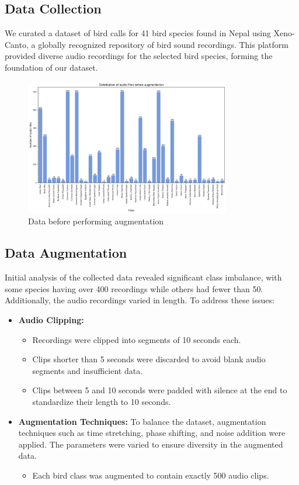 \subsection{Data Collection}
We curated a dataset of bird calls for 41 bird species found in Nepal using Xeno-Canto, a globally recognized repository of bird sound recordings. This platform provided diverse audio recordings for the selected bird species, forming the foundation of our dataset.
\begin{figure}[h!]
    \centering
    \includegraphics[width=0.8\textwidth]{images/before_augmentation.png}
    \caption{Data before performing augmentation}
    \label{fig:visualization}
\end{figure}

\newpage
\subsection{Data Augmentation}
Initial analysis of the collected data revealed significant class imbalance, with some species having over 400 recordings while others had fewer than 50. Additionally, the audio recordings varied in length. To address these issues:  
\begin{itemize}
    \item \textbf{Audio Clipping:}  
    \begin{itemize}
        \item Recordings were clipped into segments of 10 seconds each.  
        \item Clips shorter than 5 seconds were discarded to avoid blank audio segments and insufficient data.  
        \item Clips between 5 and 10 seconds were padded with silence at the end to standardize their length to 10 seconds.  
    \end{itemize}

    \item \textbf{Augmentation Techniques:}  
    To balance the dataset, augmentation techniques such as time stretching, phase shifting, and noise addition were applied. The parameters were varied to ensure diversity in the augmented data.  
    \begin{itemize}
        \item Each bird class was augmented to contain exactly 500 audio clips.
    \end{itemize}
\end{itemize}

